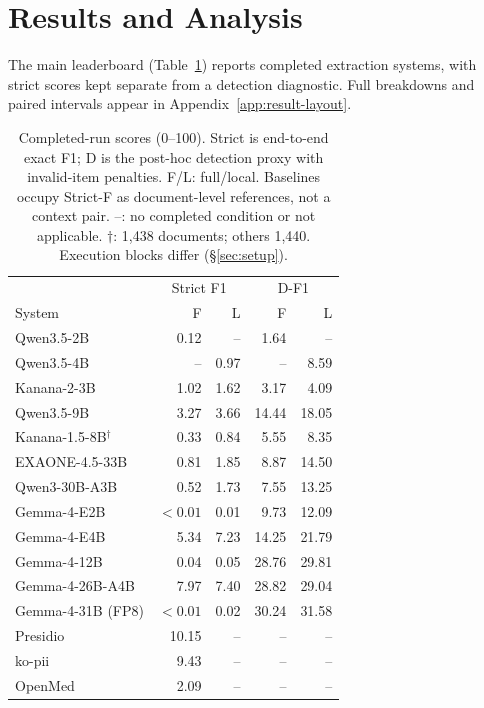 \section{Results and Analysis}
\label{sec:results}

The main leaderboard (Table~\ref{tab:main-results}) reports completed extraction systems, with strict scores kept separate from a detection diagnostic. Full breakdowns and paired intervals appear in Appendix~\ref{app:result-layout}.

\begin{table}[t]
\caption{Completed-run scores (0--100). Strict is end-to-end exact F1; D is the post-hoc detection proxy with invalid-item penalties. F/L: full/local. Baselines occupy Strict-F as document-level references, not a context pair. --: no completed condition or not applicable. $\dagger$: 1,438 documents; others 1,440. Execution blocks differ (\S\ref{sec:setup}).}
\label{tab:main-results}
\small
\begin{tabularx}{\columnwidth}{@{}>{\RaggedRight\arraybackslash}Xrrrr@{}}
\toprule
& \multicolumn{2}{c}{Strict F1} & \multicolumn{2}{c}{D-F1} \\
System & F & L & F & L \\
\midrule
Qwen3.5-2B & 0.12 & -- & 1.64 & -- \\
Qwen3.5-4B & -- & 0.97 & -- & 8.59 \\
Kanana-2-3B & 1.02 & 1.62 & 3.17 & 4.09 \\
Qwen3.5-9B & 3.27 & 3.66 & 14.44 & 18.05 \\
Kanana-1.5-8B$^\dagger$ & 0.33 & 0.84 & 5.55 & 8.35 \\
EXAONE-4.5-33B & 0.81 & 1.85 & 8.87 & 14.50 \\
Qwen3-30B-A3B & 0.52 & 1.73 & 7.55 & 13.25 \\
Gemma-4-E2B & $<0.01$ & 0.01 & 9.73 & 12.09 \\
Gemma-4-E4B & 5.34 & 7.23 & 14.25 & 21.79 \\
Gemma-4-12B & 0.04 & 0.05 & 28.76 & 29.81 \\
Gemma-4-26B-A4B & 7.97 & 7.40 & 28.82 & 29.04 \\
Gemma-4-31B (FP8) & $<0.01$ & 0.02 & 30.24 & 31.58 \\
\midrule
Presidio & 10.15 & -- & -- & -- \\
ko-pii & 9.43 & -- & -- & -- \\
OpenMed & 2.09 & -- & -- & -- \\
\bottomrule
\end{tabularx}
\end{table}

